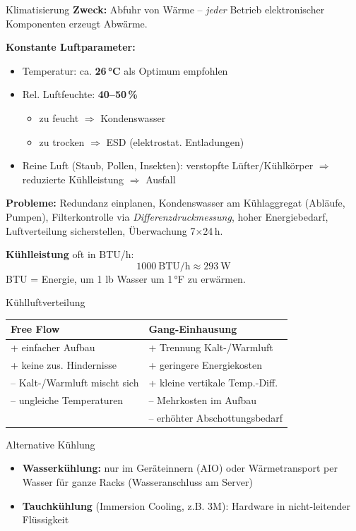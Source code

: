 \documentclass[a4paper, fontsize=7pt]{scrartcl}
\renewcommand*{\arraystretch}{1.5}  %
\begin{document}
\begin{mainbox}{Klimatisierung}
\textbf{Zweck:} Abfuhr von Wärme -- \emph{jeder} Betrieb elektronischer
Komponenten erzeugt Abwärme.

\textbf{Konstante Luftparameter:}
\begin{itemize}
    \item Temperatur: ca. \textbf{26\,°C} als Optimum empfohlen
    \item Rel. Luftfeuchte: \textbf{40--50\,\%}
    \begin{itemize}
        \item zu feucht $\Rightarrow$ Kondenswasser
        \item zu trocken $\Rightarrow$ ESD (elektrostat. Entladungen)
    \end{itemize}
    \item Reine Luft (Staub, Pollen, Insekten): verstopfte Lüfter/Kühlkörper
          $\Rightarrow$ reduzierte Kühlleistung $\Rightarrow$ Ausfall
\end{itemize}
\textbf{Probleme:} Redundanz einplanen, Kondenswasser am Kühlaggregat
(Abläufe, Pumpen), Filterkontrolle via \emph{Differenzdruckmessung}, hoher
Energiebedarf, Luftverteilung sicherstellen, Überwachung 7$\times$24\,h.

\textbf{Kühlleistung} oft in BTU/h:
$$\boxed{1000\ \text{BTU/h} \approx 293\ \text{W}}$$
BTU = Energie, um 1 lb Wasser um 1\,°F zu erwärmen.
\end{mainbox}

\begin{subbox}{Kühlluftverteilung}
\renewcommand*{\arraystretch}{1.2}
\begin{tabularx}{\linewidth}{@{}X|X@{}}
\textbf{Free Flow} & \textbf{Gang-Einhausung} \\
\hline
+ einfacher Aufbau & + Trennung Kalt-/Warmluft \\
+ keine zus. Hindernisse & + geringere Energiekosten \\
-- Kalt-/Warmluft mischt sich & + kleine vertikale Temp.-Diff. \\
-- ungleiche Temperaturen & -- Mehrkosten im Aufbau \\
 & -- erhöhter Abschottungsbedarf \\
\end{tabularx}
\end{subbox}

\begin{subbox}{Alternative Kühlung}
\begin{itemize}
    \item \textbf{Wasserkühlung:} nur im Geräteinnern (AIO) oder Wärmetransport
          per Wasser für ganze Racks (Wasseranschluss am Server)
    \item \textbf{Tauchkühlung} (Immersion Cooling, z.B. 3M): Hardware in
          nicht-leitender Flüssigkeit
\end{itemize}
\end{subbox}
\end{document}
